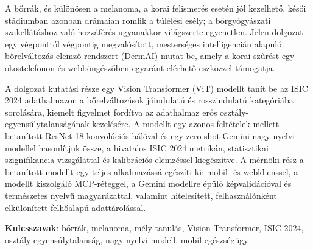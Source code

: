A bőrrák, és különösen a melanoma, a korai felismerés esetén jól kezelhető, késői
stádiumban azonban drámaian romlik a túlélési esély; a bőrgyógyászati
szakellátáshoz való hozzáférés ugyanakkor világszerte egyenetlen. Jelen dolgozat
egy végponttól végpontig megvalósított, mesterséges intelligencián alapuló
bőr\-elváltozás-elemző rendszert (DermAI) mutat be, amely a korai szűrést egy
okostelefonon és webböngészőben egyaránt elérhető eszközzel támogatja.

A dolgozat kutatási része egy Vision Transformer (ViT) modellt tanít be az ISIC
2024 adathalmazon a bőrelváltozások jó\-indulatú és rosszindulatú kategóriába
sorolására, kiemelt figyelmet fordítva az adathalmaz erős
osztály-egyensúlytalanságának kezelésére. A modellt egy azonos feltételek mellett
betanított ResNet-18 konvolúciós hálóval és egy zero-shot Gemini nagy nyelvi
modellel hasonlítjuk össze, a hivatalos ISIC 2024 metrikán, statisztikai
szignifikancia-vizsgálattal és kalibrációs elemzéssel kiegészítve. A mérnöki rész
a betanított modellt egy teljes alkalmazássá egészíti ki: mobil- és webklienssel,
a modellt kiszolgáló MCP-réteggel, a Gemini modellre épülő képvalidációval és
természetes nyelvű magyarázattal, valamint hitelesített, felhasználónként
elkülönített felhőalapú adattárolással.

\textbf{Kulcsszavak}: bőrrák, melanoma, mély tanulás, Vision Transformer, ISIC
2024, osztály-egyensúlytalanság, nagy nyelvi modell, mobil egészségügy

